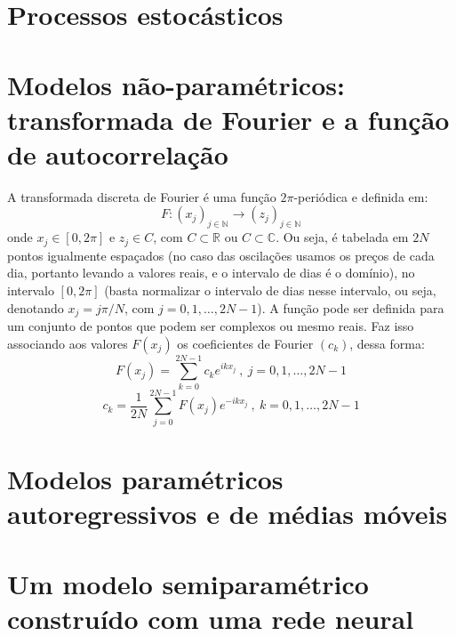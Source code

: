\section{Processos estocásticos}

\section{Modelos não-paramétricos: transformada de Fourier e a função de autocorrelação}

A transformada discreta de Fourier é uma função $2\pi$-periódica e definida em: \[F:(x_j)_{j \in \mathbb{N}} \rightarrow (z_j)_{j \in \mathbb{N}} \] onde $ x_j \in [0, 2\pi]$ e $ z_j \in C $, com $C \subset \mathbb{R}$ ou $C \subset \mathbb{C}$. Ou seja, é tabelada em $2N$ pontos igualmente espaçados (no caso das oscilações usamos os preços de cada dia, portanto levando a valores reais, e o intervalo de dias é o domínio), no intervalo $[0, 2\pi]$ (basta normalizar o intervalo de dias nesse intervalo, ou seja, denotando $x_j = j\pi/N $, com $j = 0, 1, \dots, 2N-1$). A função pode ser definida para um conjunto de pontos que podem ser complexos ou mesmo reais. Faz isso associando aos valores $F(x_j)$ os coeficientes de Fourier $(c_k)$, dessa forma:
\begin{equation}\label{tfd_1}
F(x_j) = \sum_{k=0}^{2N-1} c_k e^{ikx_j}\ ,\ j=0, 1, \dots, 2N-1
\end{equation}
\begin{equation}\label{tfd_2}
c_k = \frac{1}{2N} \sum_{j=0}^{2N-1} F(x_j) e^{-ikx_j}\ ,\ k=0, 1, \dots, 2N-1
\end{equation}

\section{Modelos paramétricos autoregressivos e de médias móveis}

\section{Um modelo semiparamétrico construído com uma rede neural}